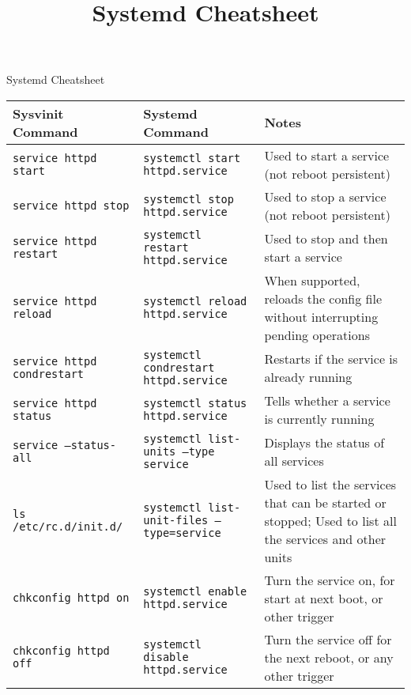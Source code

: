 \documentclass[a4paper]{article}
\title{Systemd Cheatsheet}
\begin{document}
\begin{center}

{\huge Systemd Cheatsheet}

\vspace{7mm}
\small

\begin{tabularx}{\textwidth}{ |l|X|X| }
\hline
\rowcolor[gray]{.8}
\bfseries Sysvinit Command    & \bfseries Systemd Command                                                             & \bfseries Notes \\\hline
\tt service httpd start       & \tt systemctl start httpd.service                                                     & Used to start a service (not reboot persistent) \\\hline
\tt service httpd stop        & \tt systemctl stop httpd.service                                                      & Used to stop a service (not reboot persistent) \\\hline
\tt service httpd restart     & \tt systemctl restart httpd.service                                                   & Used to stop and then start a service \\\hline
\tt service httpd reload      & \tt systemctl reload httpd.service                                                    & When supported, reloads the config file without interrupting pending operations \\\hline
\tt service httpd condrestart & \tt systemctl condrestart httpd.service                                               & Restarts if the service is already running \\\hline
\tt service httpd status      & \tt systemctl status httpd.service                                                    & Tells whether a service is currently running \\\hline
\tt service --status-all      & \tt systemctl list-units --type service                                               & Displays the status of all services \\\hline
\tt ls /etc/rc.d/init.d/      & \tt systemctl list-unit-files --type=service                                          & Used to list the services that can be started or stopped; Used to list all the services and other units \\\hline
\tt chkconfig httpd on        & \tt systemctl enable httpd.service                                                    & Turn the service on, for start at next boot, or other trigger \\\hline
\tt chkconfig httpd off       & \tt systemctl disable httpd.service                                                   & Turn the service off for the next reboot, or any other trigger \\\hline

\end{tabularx}
\end{center}
\end{document}
